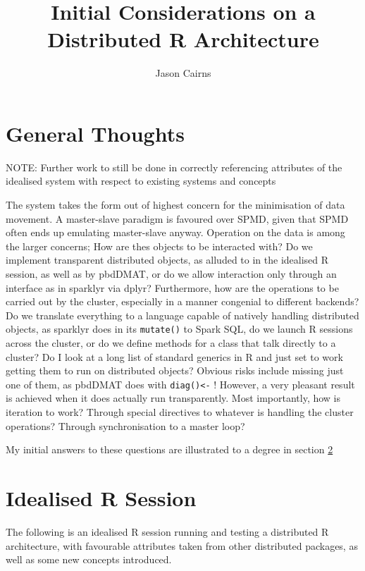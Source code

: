 \documentclass[a4paper,10pt]{article}
\begin{document}
\title{Initial Considerations on a Distributed R Architecture}
\author{Jason Cairns}
  
\maketitle

\section{General Thoughts}

NOTE: Further work to still be done in correctly referencing attributes of the
      idealised system with respect to existing systems and concepts

The system takes the form out of highest concern for the minimisation of
data movement. 
A master-slave paradigm is favoured over SPMD, given that SPMD often
ends up emulating master-slave anyway.
Operation on the data is among the larger concerns;
How are thes objects to be interacted with? 
Do we implement transparent distributed objects, as alluded to in the idealised
R session, as well as by pbdDMAT, or do we allow interaction only through an
interface as in sparklyr via dplyr?
Furthermore, how are the operations to be carried out by the cluster,
especially in a manner congenial to different backends?
Do we translate everything to a language capable of natively handling
distributed objects, as sparklyr does in its \texttt{mutate()} to Spark SQL, do
we launch R sessions across the cluster, or do we define methods for a class
that talk directly to a cluster?
Do I look at a long list of standard generics in R and just set to work getting
them to run on distributed objects? Obvious risks include missing just one of
them, as pbdDMAT does with \texttt{diag()<-} !
However, a very pleasant result is achieved when it does actually run
transparently.
Most importantly, how is iteration to work?
Through special directives to whatever is handling the cluster operations?
Through synchronisation to a master loop?

My initial answers to these questions are illustrated to a degree in section
\ref{sec:idealised_r_session}

\section{Idealised R Session}\label{sec:idealised_r_session}      

The following is an idealised R session running and testing a distributed R
architecture, with favourable attributes taken from other distributed packages,
as well as some new concepts introduced.
\end{document}
